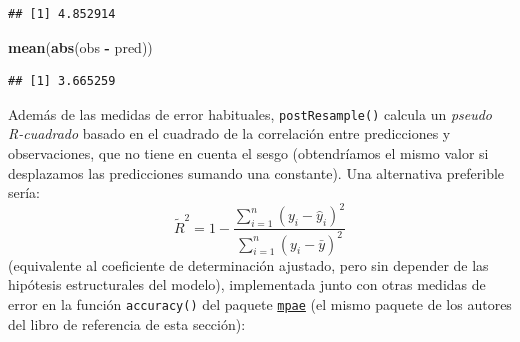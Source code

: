 \documentclass[
]{book}
\newenvironment{Shaded}{\begin{snugshade}}{\end{snugshade}}
\newcommand{\FunctionTok}[1]{\textcolor[rgb]{0.13,0.29,0.53}{\textbf{#1}}}
\newcommand{\NormalTok}[1]{#1}
\newcommand{\SpecialCharTok}[1]{\textcolor[rgb]{0.81,0.36,0.00}{\textbf{#1}}}
\theoremstyle{break}
\theoremstyle{nonumberplain}
\begin{document}
\begin{verbatim}
## [1] 4.852914
\end{verbatim}

\begin{Shaded}
\begin{Highlighting}[]
\FunctionTok{mean}\NormalTok{(}\FunctionTok{abs}\NormalTok{(obs }\SpecialCharTok{{-}}\NormalTok{ pred))}
\end{Highlighting}
\end{Shaded}

\begin{verbatim}
## [1] 3.665259
\end{verbatim}

Además de las medidas de error habituales, \texttt{postResample()} calcula un \emph{pseudo R-cuadrado} basado en el cuadrado de la correlación entre predicciones y observaciones, que no tiene en cuenta el sesgo (obtendríamos el mismo valor si desplazamos las predicciones sumando una constante). Una alternativa preferible sería:
\[\tilde R^2 = 1 - \frac{\sum_{i=1}^n(y_i - \hat y_i)^2}{\sum_{i=1}^n(y_i - \bar y)^2}\]
(equivalente al coeficiente de determinación ajustado, pero sin depender de las hipótesis estructurales del modelo), implementada junto con otras medidas de error en la función \texttt{accuracy()} del paquete \href{https://cran.r-project.org/package=mpae}{\texttt{mpae}} (el mismo paquete de los autores del libro de referencia de esta sección):
\end{document}
